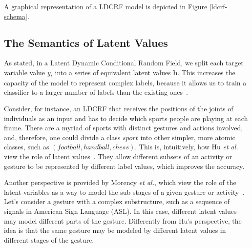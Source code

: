 \documentclass[10pt, conference]{IEEEtran}
\begin{document}
\noindent A graphical representation of a LDCRF model is depicted in Figure \ref{ldcrf-schema}.



\subsection{The Semantics of Latent Values}
\label{dhvv}


As stated, in a Latent Dynamic Conditional Random Field, we split each target variable value $y_t$ into a series of equivalent latent values $\mathbf{h}$. This increases the capacity of the model to represent complex labels, because it allows us to train a classifier to a larger number of labels than the existing ones~\cite{ldcrf}. 


Consider, for instance, an LDCRF that receives the positions of the joints of individuals as an input and has to decide which sports people are playing at each frame. There are a myriad of sports with  distinct gestures and actions involved, and, therefore, one could divide a class $sport$ into other simpler, more atomic classes, such as $(football,handball,chess)$. This is, intuitively, how Hu \textit{et al.} view the role of latent values~\cite{hucrf}. They allow different subsets of an activity or gesture to be represented by different label values, which improves the accuracy.

Another perspective is provided by Morency \textit{et al.}, which view the role of the latent variables as a way to model the sub stages of a given gesture or activity~\cite{ldcrf}. Let's consider a gesture with a complex substructure, such as a sequence of signals in American Sign Language (ASL). In this case, different latent values may model different parts of the gesture. Differently from Hu's perspective, the idea is that the same gesture may be modeled by different latent values in different stages of the gesture. 


\end{document}
